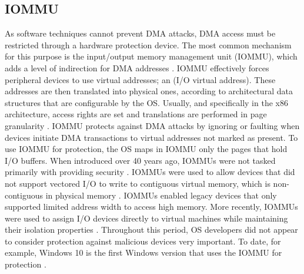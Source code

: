  \subsection{IOMMU}
As software techniques cannot prevent DMA attacks, DMA access must be restricted through a hardware protection device. The most common mechanism for this purpose is the input/output memory management unit (IOMMU), which adds a level of indirection for DMA addresses \cite{WRC08,YZ15,SB12,MTF12}. IOMMU effectively forces peripheral devices to use virtual addresses; an \iova(I/O virtual address). These addresses are then translated into physical ones, according to architectural data structures that are configurable by the OS. Usually, and specifically in the x86 architecture, access rights are set and translations are performed in page granularity \cite{Int16b, AMD16}. 
IOMMU protects against DMA attacks by ignoring or faulting when devices initiate DMA transactions to virtual addresses not marked as present. To use IOMMU for protection, the OS maps in IOMMU only the pages that hold I/O buffers. When introduced over 40 years ago, IOMMUs were not tasked primarily with providing security \cite{DWT79}. IOMMUs were used to allow devices that did not support vectored I/O to write to contiguous virtual memory, which is non-contiguous in physical memory \cite{Chu96, WMM97}. IOMMUs enabled legacy devices that only supported limited address width to access high memory. More recently, IOMMUs were used to assign I/O devices directly to virtual machines while maintaining their isolation properties \cite{Int16b, AMD16}. Throughout this period, OS developers did not appear to consider protection against malicious devices very important. To date, for example, Windows 10 is the first Windows version that uses the IOMMU for protection \cite{Mic17}.
